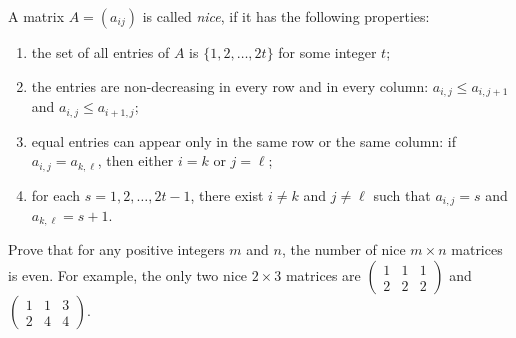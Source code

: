 \documentclass{article}
\begin{document}
\setlength{\parindent}{0pt}
A matrix $A=(a_{ij})$ is called \emph{nice}, if it has the following properties:
\begin{enumerate}[label=(\roman*)]
\item the set of all entries of $A$ is $\{1,2,\ldots,2t\}$ for some integer $t$;
\item the entries are non-decreasing in every row and in every column: $a_{i,j}\leq a_{i,j+1}$ and $a_{i,j}\leq a_{i+1,j}$;
\item equal entries can appear only in the same row or the same column: if $a_{i,j}=a_{k,\ell}$, then either $i=k$ or $j=\ell$;
\item for each $s=1,2,\ldots,2t-1$, there exist $i\ne k$ and $j\ne \ell$ such that $a_{i,j}=s$ and $a_{k,\ell}=s+1$.
\end{enumerate}
Prove that for any positive integers $m$ and $n$, the number of nice $m\times n$ matrices is even.\newline
For example, the only two nice $2\times 3$ matrices are $\begin{pmatrix}1&1&1\\2&2&2\end{pmatrix}$ and $\begin{pmatrix}1&1&3\\2&4&4\end{pmatrix}$.
\end{document}
